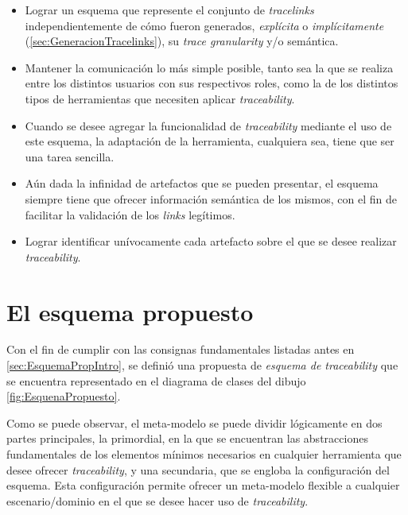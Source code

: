 \documentclass[a4paper,12pt,oneside,spanish]{book}
\begin{document}
\begin{itemize}

\item Lograr un esquema que represente el conjunto de \textit{tracelinks} independientemente de cómo fueron generados, \textit{explícita} o \textit{implícitamente} (\ref{sec:GeneracionTracelinks}), su \textit{trace granularity} y/o semántica.

\item Mantener la comunicación lo más simple posible, tanto sea la que se realiza entre los distintos usuarios con sus respectivos roles, como la de los distintos tipos de herramientas que necesiten aplicar \textit{traceability}.

\item Cuando se desee agregar la funcionalidad de \textit{traceability} mediante el uso de este esquema, la adaptación de la herramienta, cualquiera sea, tiene que ser una tarea sencilla.

\item Aún dada la infinidad de artefactos que se pueden presentar, el esquema siempre tiene que ofrecer información semántica de los mismos, con el fin de facilitar la validación de los \textit{links} legítimos.

\item Lograr identificar unívocamente cada artefacto sobre el que se desee realizar \textit{traceability}.

\end{itemize}

\section{El esquema propuesto}
\label{sec:EsquemaTraceability}

Con el fin de cumplir con las consignas fundamentales listadas antes en \ref{sec:EsquemaPropIntro}, se definió una propuesta de \textit{esquema de traceability} que se encuentra representado en el diagrama de clases del dibujo \ref{fig:EsquenaPropuesto}.

Como se puede observar, el meta-modelo se puede dividir lógicamente en dos partes principales, la primordial, en la que se encuentran las abstracciones fundamentales de los elementos mínimos necesarios en cualquier herramienta que desee ofrecer \textit{traceability}, y una secundaria, que se engloba la configuración del esquema. Esta configuración permite ofrecer un meta-modelo flexible a cualquier escenario/dominio en el que se desee hacer uso de \textit{traceability}.
\end{document}
